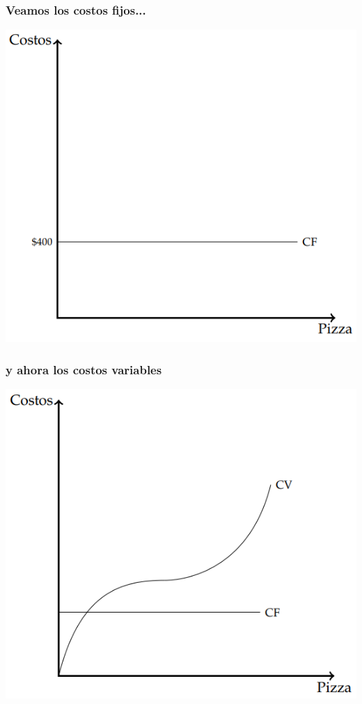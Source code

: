 \documentclass{beamer}
\begin{document}
\begin{frame}
\frametitle{Veamos los costos fijos...}
\centering
\includegraphics[scale=0.6]{../Figures/C13.1.png}
\end{frame}

\begin{frame}
\frametitle{y ahora los costos variables}
\centering
\includegraphics[scale=0.6]{../Figures/C13.2.png}
\end{frame}
\end{document}
